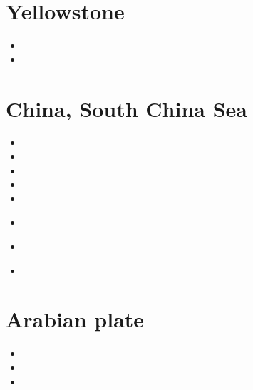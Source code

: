 \section{Yellowstone}

\begin{scriptsize}
\begin{itemize}
\item[\twothousandthirteen]
\item[\twothousandeighteen]
\end{itemize}
\end{scriptsize}

\section{China, South China Sea}

\begin{scriptsize}
\begin{itemize}
\item[\twothousandten] 
\item[\twothousandfifteen] 
\item[\twothousandsixteen] 
\item[\twothousandeighteen] 
\item[\twothousandnineteen] 
\item[\twothousandtwenty] 
 \\
\item[\twothousandtwentyone] 
 \\
\item[\twothousandtwentytwo] 
\end{itemize}
\end{scriptsize}

\section{Arabian plate}

\begin{scriptsize}
\begin{itemize}
\item[\twothousandthirteen] 
\item[\twothousandfifteen] 
\item[\twothousandtwentytwo] 
\end{itemize}
\end{scriptsize}

